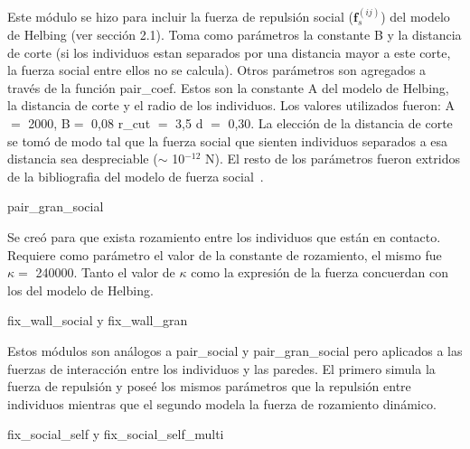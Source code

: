 Este módulo se hizo para incluir la fuerza de repulsión social ($\mathbf{f}_s^{(ij)}$) del modelo de Helbing (ver sección 2.1). Toma como parámetros la constante B y la distancia de corte (si los individuos estan separados por una distancia mayor a este corte, la fuerza social entre ellos no se calcula).
Otros parámetros son agregados a través de la función pair\_coef. Estos son la constante A del modelo de Helbing, la distancia 
de corte y el radio de los individuos. Los valores utilizados fueron: A $=$ 2000, B$=$ 0,08 r\_cut $=$ 3,5 d $=$ 0,30.
La elección de la distancia de corte se tomó de modo tal que la fuerza social que sienten individuos separados a esa distancia
sea despreciable ($\sim$ 10$^{-12}$ N). El resto de los parámetros fueron extridos de la bibliografia del modelo de fuerza social~\cite{Helbing1}.

{\Large pair\_gran\_social}

Se creó para que exista rozamiento entre los individuos que están en contacto. Requiere como parámetro el valor de la constante de rozamiento, el mismo fue $\kappa =$ 240000. Tanto el valor de $\kappa$ como la expresión de la fuerza concuerdan con los del modelo de Helbing.

{\Large fix\_wall\_social y fix\_wall\_gran}

Estos módulos son análogos a pair\_social y pair\_gran\_social pero aplicados a las fuerzas de interacción entre los individuos y las paredes. El primero simula la fuerza de repulsión y poseé los mismos parámetros que la repulsión entre individuos mientras que el segundo modela la fuerza de rozamiento dinámico. 

{\Large fix\_social\_self y fix\_social\_self\_multi}

